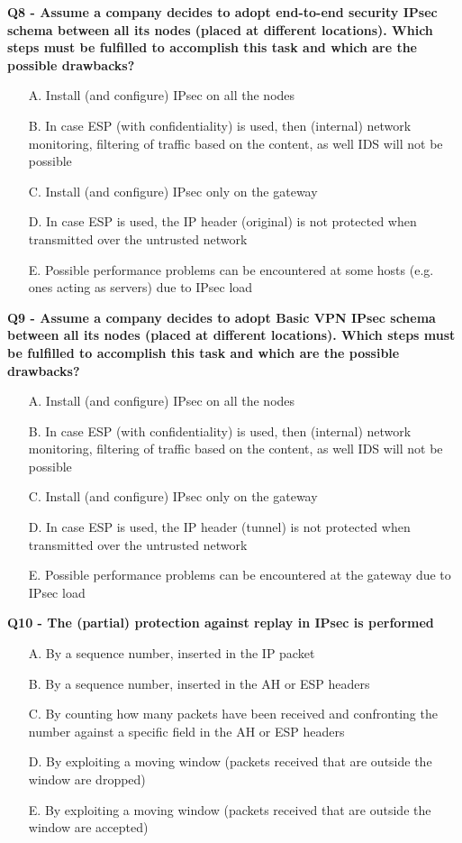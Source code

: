 \textbf{Q8 - Assume a company decides to adopt end-to-end security IPsec schema between all its nodes (placed at different locations). 
Which steps must be fulfilled to accomplish this task and which are the possible drawbacks?}
\begin{itemize}
    \item[A.] Install (and configure) IPsec on all the nodes
    \item[B.] In case ESP (with confidentiality) is used, then (internal) network monitoring, filtering of traffic based on the content, as well IDS will not be possible
    \item[C.] Install (and configure) IPsec only on the gateway
    \item[D.] In case ESP is used, the IP header (original) is not protected when transmitted over the untrusted network
    \item[E.] Possible performance problems can be encountered at some hosts (e.g. ones acting as servers) due to IPsec load
\end{itemize}

\textbf{Q9 - Assume a company decides to adopt Basic VPN IPsec schema between all its nodes (placed at different locations). 
Which steps must be fulfilled to accomplish this task and which are the possible drawbacks?}
\begin{itemize}
    \item[A.] Install (and configure) IPsec on all the nodes
    \item[B.] In case ESP (with confidentiality) is used, then (internal) network monitoring, filtering of traffic based on the content, as well IDS will not be possible
    \item[C.] Install (and configure) IPsec only on the gateway
    \item[D.] In case ESP is used, the IP header (tunnel) is not protected when transmitted over the untrusted network
    \item[E.] Possible performance problems can be encountered at the gateway due to IPsec load
\end{itemize}

\textbf{Q10 - The (partial) protection against replay in IPsec is performed}
\begin{itemize}
    \item[A.] By a sequence number, inserted in the IP packet
    \item[B.] By a sequence number, inserted in the AH or ESP headers
    \item[C.] By counting how many packets have been received and confronting the number against a specific field in the AH or ESP headers
    \item[D.] By exploiting a moving window (packets received that are outside the window are dropped)
    \item[E.] By exploiting a moving window (packets received that are outside the window are accepted)
\end{itemize}

